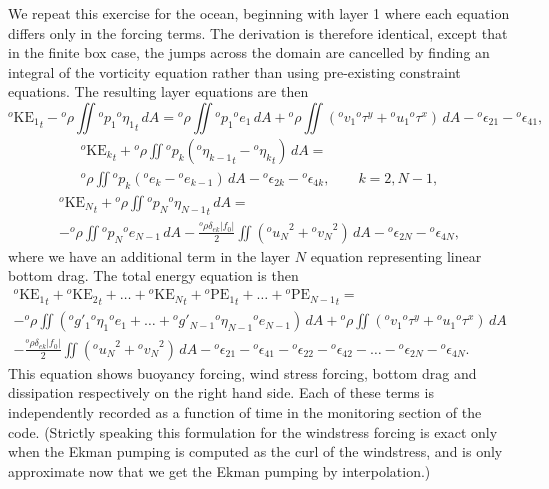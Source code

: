 \documentclass[11pt, a4paper,twoside]{article}
\newcommand{\etb}[2]{{{}^{#1}\eta_{#2}}}
\newcommand{\rhb}[1]{{{}^{#1}\rho}}
\newcommand{\gp}[2]{{}^{#1}g'_{#2}}
\newcommand{\p}[2]{{{}^{#1}p_{#2}}}
\newcommand{\uu}[2]{{{}^{#1}u_{#2}}}
\newcommand{\vv}[2]{{{}^{#1}v_{#2}}}
\newcommand{\e}[2]{{{}^{#1}e_{#2}}}
\newcommand{\tx}[2]{{}^{#1}\tau^{#2}}
\newcommand{\pe}[2]{{}^{#1}\textrm{PE}_{#2}}
\newcommand{\ke}[2]{{}^{#1}\textrm{KE}_{#2}}
\newcommand{\eps}[2]{{}^{#1}\epsilon_{#2}}
\newcommand{\delek}[0]{\delta_{ek}}
\numberwithin{equation}{section}
\begin{document}
We repeat this exercise for the ocean, beginning with layer 1 where each equation differs only in the forcing terms.
The derivation is therefore identical, except that in the finite box case, the jumps across the domain are cancelled by finding an integral of the vorticity equation rather than using pre-existing constraint equations.
The resulting layer equations are then
\begin{equation}
{\ke{o}{1}}_t - \rhb{o}\iint\p{o}{1} \etb{o}{1}_t \, dA = \rhb{o}\iint\p{o}{1} \e{o}{1} \, dA + \rhb{o} \iint \left( \vv{o}{1}\tx{o}{y} + \uu{o}{1}\tx{o}{x}\right) \, dA - \eps{o}{21}- \eps{o}{41},
\end{equation}
\begin{multline}
{\ke{o}{k}}_t + \rhb{o}\iint\p{o}{k}\left(\etb{o}{k-1}_t - \etb{o}{k}_t\right) \, dA =\\
 \rhb{o}\iint\p{o}{k} \left(\e{o}{k} - \e{o}{k-1}\right) \, dA - \eps{o}{2k}- \eps{o}{4k}, \quad \quad k=2,N-1,
\end{multline}
\begin{multline}
{\ke{o}{N}}_t + \rhb{o}\iint\p{o}{N}\etb{o}{N-1}_t  \, dA = \\
- \rhb{o}\iint\p{o}{N} \e{o}{N-1} \, dA- \frac{\rhb{o}\delek \lvert f_0 \rvert}{2} \iint \left(\uu{o}{N}^2 + \vv{o}{N}^2\right)\, dA - \eps{o}{2N} - \eps{o}{4N},
\end{multline}
where we have an additional term in the layer $N$ equation representing linear bottom drag.
The total energy equation is then
\begin{multline}
{\ke{o}{1}}_t + {\ke{o}{2}}_t + \ldots + {\ke{o}{N}}_t + {\pe{o}{1}}_t  + \ldots + {\pe{o}{N-1}}_t = \\
- \rhb{o}\iint \left(\gp{o}{1}\etb{o}{1} \e{o}{1} + \ldots +\gp{o}{N-1}\etb{o}{N-1} \e{o}{N-1} \right)\, dA + \rhb{o} \iint \left( \vv{o}{1}\tx{o}{y} + \uu{o}{1}\tx{o}{x}\right) \, dA\\
- \frac{\rhb{o}\delek  \lvert f_0 \rvert }{2} \iint \left(\uu{o}{N}^2 + \vv{o}{N}^2\right)\, dA  - \eps{o}{21} - \eps{o}{41} - \eps{o}{22}- \eps{o}{42} - \ldots- \eps{o}{2N}- \eps{o}{4N}.
\end{multline}
This equation shows buoyancy forcing, wind stress forcing, bottom drag and dissipation respectively on the right hand side.
Each of these terms is independently recorded as a function of time in the monitoring section of the code.
(Strictly speaking this formulation for the windstress forcing is exact only when the Ekman pumping is computed as the curl of the windstress, and is only approximate now that we get the Ekman pumping by interpolation.)
\end{document}
